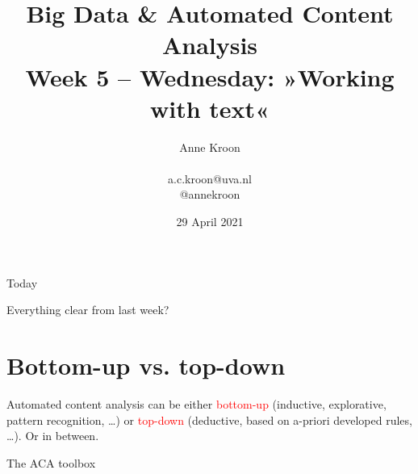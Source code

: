 \documentclass[handout]{beamer}
\title[Big Data and Automated Content Analysis]{\textbf{Big Data \& Automated Content Analysis} \\ Week 5 -- Wednesday: »Working with text«}
\author[Anne Kroon]{Anne Kroon \\ ~ \\ \footnotesize{a.c.kroon@uva.nl \\@annekroon}}
\date{29 April 2021}
\institute[UvA]{Afdeling Communicatiewetenschap \\Universiteit van Amsterdam}
\begin{document}
	
	\begin{frame}{}
		\titlepage
	\end{frame}
	
	\begin{frame}{Today}
		\tableofcontents
	\end{frame}
	
	
	\begin{frame}[standout]
		Everything clear from last week?
	\end{frame}
	



\section{Bottom-up vs. top-down}

\begin{frame}[standout]
Automated content analysis can be either \textcolor{red}{bottom-up} (inductive, explorative, pattern recognition, \ldots) or \textcolor{red}{top-down} (deductive, based on a-priori developed rules, \ldots). Or in between.
\end{frame}



\begin{frame}{The ACA toolbox}
	\\
	\cite{Boumans2016}
\end{frame}
\end{document}
